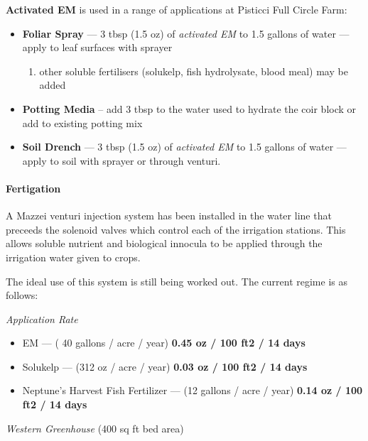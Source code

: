 \textbf{Activated EM} is used in a range of applications at Pisticci
Full Circle Farm:

\begin{itemize}
\itemsep1pt\parskip0pt
\item
  \textbf{Foliar Spray} --- 3 tbsp (1.5 oz) of \emph{activated EM} to
  1.5 gallons of water --- apply to leaf surfaces with sprayer

  \begin{enumerate}
  \def\labelenumi{\arabic{enumi}.}
  \itemsep1pt\parskip0pt
  \item
    other soluble fertilisers (solukelp, fish hydrolysate, blood meal)
    may be added
  \end{enumerate}
\item
  \textbf{Potting Media} -- add 3 tbsp to the water used to hydrate the
  coir block or add to existing potting mix
\item
  \textbf{Soil Drench} --- 3 tbsp (1.5 oz) of \emph{activated EM} to 1.5
  gallons of water --- apply to soil with sprayer or through venturi.
\end{itemize}

\paragraph{Fertigation}\label{fertigation}

A Mazzei venturi injection system has been installed in the water line
that preceeds the solenoid valves which control each of the irrigation
stations. This allows soluble nutrient and biological innocula to be
applied through the irrigation water given to crops.

The ideal use of this system is still being worked out. The current
regime is as follows:

\emph{Application Rate}

\begin{itemize}
\itemsep1pt\parskip0pt
\item
  EM --- ( 40 gallons / acre / year) \textbf{0.45 oz / 100 ft2 / 14
  days}
\item
  Solukelp --- (312 oz / acre / year) \textbf{0.03 oz / 100 ft2 / 14
  days}
\item
  Neptune's Harvest Fish Fertilizer --- (12 gallons / acre / year)
  \textbf{0.14 oz / 100 ft2 / 14 days}
\end{itemize}

\emph{Western Greenhouse} (400 sq ft bed area)

